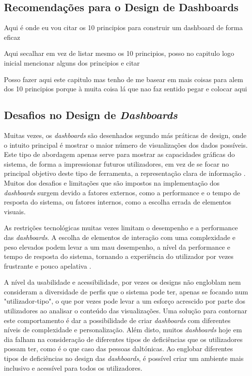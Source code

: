 \subsection{Recomendações para o Design de Dashboards} %
\label{sub:recomendacoes}

Aqui é onde eu vou citar os 10 principios para construir um dashboard de forma eficaz

Aqui secalhar em vez de listar mesmo os 10 principios, posso no capitulo logo inicial mencionar alguns dos principios e citar

Posso fazer aqui este capitulo mas tenho de me basear em mais coisas para alem dos 10 principios porque à muita coisa lá que nao faz sentido pegar e colocar aqui

\subsection{Desafios no Design de \textit{Dashboards}}
\label{sec:desafios_design}

Muitas vezes, os \textit{dashboards} são desenhados segundo más práticas de design, onde o intuito principal é mostrar o maior número de visualizações dos dados possíveis. Este tipo de abordagem apenas serve para mostrar as capacidades gráficas do sistema, de forma a impressionar futuros utilizadores, em vez de se focar no principal objetivo deste tipo de ferramenta, a representação clara de informação \cite{janes2013effective}. Muitos dos desafios e limitações que são impostos na implementação dos \textit{dashboards} surgem devido a fatores externos, como a performance e o tempo de resposta do sistema, ou fatores internos, como a escolha errada de elementos visuais. 

As restrições tecnológicas muitas vezes limitam o desempenho e a performance das \textit{dashboards}. A escolha de elementos de interação com uma complexidade e peso elevados podem levar a um mau desempenho, a nível da performance e tempo de resposta do sistema, tornando a experiência do utilizador por vezes frustrante e pouco apelativa \cite{eckerson2010performance}. 

A nível da usabilidade e acessibilidade, por vezes os designs não engloblam nem consideram a diversidade de perfis que o sistema pode ter, apenas se focando num "utilizador-tipo", o que por vezes pode levar a um esforço acrescido por parte dos utilizadores ao analisar o conteúdo das visualizações. Uma solução para contornar este comportamento é dar a possibilidade de criar \textit{dashboards} com diferentes níveis de complexidade e personalização. Além disto, muitos \textit{dashboards} hoje em dia falham na consideração de diferentes tipos de deficiências que os utilizadores possam ter, como é o que caso das pessoas daltónicas. Ao englobar diferentes tipos de deficiências no design das \textit{dashboards}, é possível criar um ambiente mais inclusivo e acessível para todos os utilizadores.

